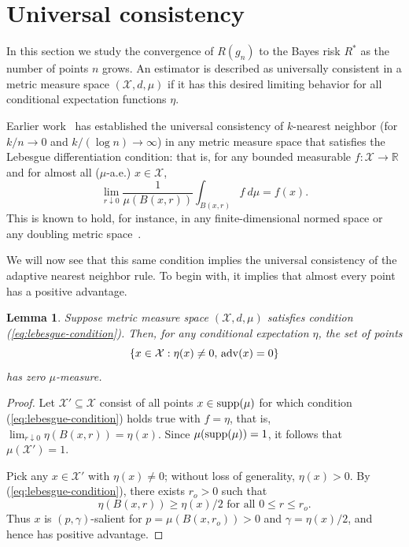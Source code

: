 \documentclass{article}
\def\R{{\mathbb{R}}}
\def\X{{\mathcal X}}
\def\supp{{\rm supp}}
\def\adv{{\rm adv}}
\newtheorem{lemma}[theorem]{Lemma}
\newcommand{\new}[1]{\color{red} #1}
\begin{document}
\section{Universal consistency}\label{sec:gen2}
\label{sec:universal-consistency}

In this section we study the convergence of $R(g_n)$ to the Bayes risk $R^*$ as the number of points $n$ grows. An estimator is described as universally consistent in a metric measure space $(\X, d, \mu)$ if it has this desired limiting behavior for all conditional expectation functions $\eta$.

Earlier work~\cite{ChaudhuriDasgupta2014} has established the universal consistency of $k$-nearest neighbor (for $k/n \rightarrow 0$ and $k/(\log n) \rightarrow \infty$) in any metric measure space that satisfies the Lebesgue differentiation condition: that is, for any bounded measurable $f: \X \rightarrow \R$ and for almost all ($\mu$-a.e.) $x \in \X$,
\begin{equation}
\lim_{r \downarrow 0} \frac{1}{\mu(B(x,r))} \int_{B(x,r)} f \ d\mu = f(x) .
\label{eq:lebesgue-condition}
\end{equation}
This is known to hold, for instance, in any finite-dimensional normed space or any doubling metric space~\cite[Chapter 1]{H01}.

We will now see that this same condition implies the universal consistency of the adaptive nearest neighbor rule. To begin with, it implies that almost every point has a positive advantage.
\begin{lemma}
Suppose metric measure space $(\X, d, \mu)$ satisfies condition (\ref{eq:lebesgue-condition}). Then,
{\new{for any conditional expectation $\eta$}}, the set of points
$$ \{x \in \X: \eta(x) \neq 0, \, \adv(x) = 0\}$$
has zero $\mu$-measure.
\label{lemma:positive-advantage}
\end{lemma}
\begin{proof}
Let $\X' \subseteq \X$ consist of all points $x \in \supp(\mu)$ for which condition (\ref{eq:lebesgue-condition}) holds true with $f=\eta$, that is, $\lim_{r \downarrow 0} \eta(B(x,r)) = \eta(x)$. 
Since $\mu(\supp(\mu))=1$, it follows that $\mu(\X') = 1$. 

Pick any $x \in \X'$ with $\eta(x) \neq 0$; without loss of generality, $\eta(x) > 0$. By (\ref{eq:lebesgue-condition}), there exists $r_o > 0$ such that
$$\eta(B(x,r)) \geq \eta(x)/2 \mbox{\  for all \ } 0 \leq r \leq r_o.$$
Thus $x$ is $(p,\gamma)$-salient for $p = \mu(B(x,r_o)) > 0$ and $\gamma = \eta(x)/2$, and hence has positive advantage.
\end{proof}
\end{document}

